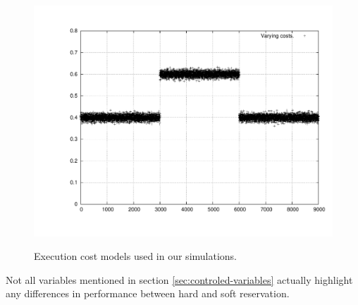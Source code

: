 \documentclass[times, 10pt,twocolumn]{article}
\begin{document}
\begin{figure}[t]
{    \includegraphics[scale=0.33]{trace-trifasico}
    \label{fig:plot-trace-trifasico}
  }
  \caption{Execution cost models used in our simulations.}
  \label{fig:ex-costs}
\end{figure}


\label{sec:simulation-results}

Not all variables mentioned in section \ref{sec:controled-variables}
actually highlight any differences in performance between hard and
soft reservation.
\end{document}
